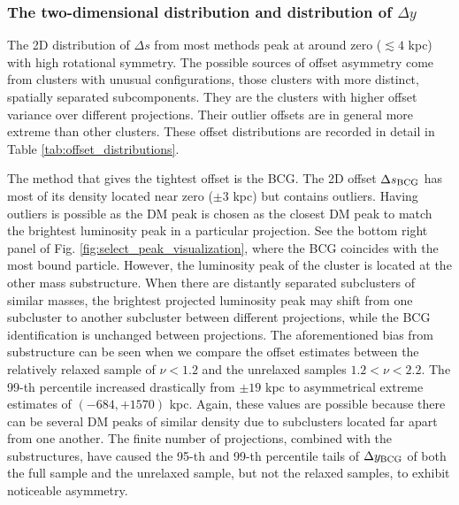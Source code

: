 \subsubsection{The two-dimensional distribution and distribution of $\Delta y$}
The 2D distribution of $\Delta s$ from most methods peak at
around zero ($\lesssim 4$ kpc) with high rotational symmetry. 
The possible sources of offset asymmetry come from clusters with unusual configurations,
those clusters with more distinct, spatially separated subcomponents.
They are the clusters with higher offset variance over different projections. 
Their outlier offsets are in general more extreme than other clusters.
These offset distributions are recorded in detail in Table
\ref{tab:offset_distributions}. 

The method that gives the tightest offset is the BCG. 
The 2D offset $\Delta s_{\rm BCG}$ has most of its density located near zero
($\pm 3$ kpc) but 
contains outliers. Having outliers is possible 
as the DM peak is chosen as the closest DM peak to match the
brightest luminosity peak in a particular projection.
See the bottom right panel of Fig. \ref{fig:select_peak_visualization}, where the BCG 
coincides with the most bound particle. However, the luminosity peak of the
cluster is located at the other mass substructure. 
When there are distantly separated subclusters of similar masses, 
the brightest projected luminosity peak 
may shift from one subcluster to another subcluster between different projections,
while the BCG identification is unchanged between projections.
The aforementioned bias from substructure can be seen when we compare the
offset estimates between the relatively relaxed sample of $\nu < 1.2$ and the
unrelaxed samples $1.2 < \nu < 2.2$. The 99-th percentile increased drastically
from $\pm 19$ kpc to asymmetrical extreme estimates of $(-684, +1570)$ kpc.
Again, these values are possible because there can be several DM peaks of
similar density due to subclusters located far apart from one another.
The finite number of projections, combined with the substructures, have caused 
the 95-th and 99-th percentile tails of $\Delta y_{\rm BCG}$ of both the full
sample and the unrelaxed sample, but not the relaxed samples, to exhibit 
noticeable asymmetry.

